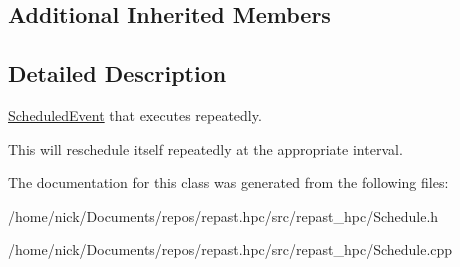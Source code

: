 \subsection*{Additional Inherited Members}


\subsection{Detailed Description}
\hyperlink{classrepast_1_1_scheduled_event}{Scheduled\-Event} that executes repeatedly. 

This will reschedule itself repeatedly at the appropriate interval. 

The documentation for this class was generated from the following files\-:\begin{DoxyCompactItemize}
\item 
/home/nick/\-Documents/repos/repast.\-hpc/src/repast\-\_\-hpc/Schedule.\-h\item 
/home/nick/\-Documents/repos/repast.\-hpc/src/repast\-\_\-hpc/Schedule.\-cpp\end{DoxyCompactItemize}
